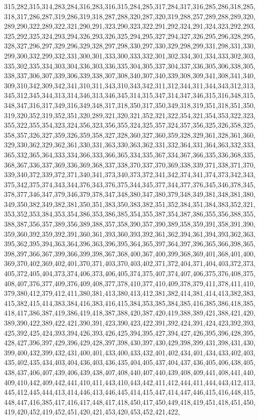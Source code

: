 315,282,315,314,283,284,316,283,316,315,284,285,317,284,317,316,285,286,318,285,318,317,286,287,319,286,319,318,287,288,320,287,320,319,288,257,289,288,289,320,289,290,322,289,322,321,290,291,323,290,323,322,291,292,324,291,324,323,292,293,325,292,325,324,293,294,326,293,326,325,294,295,327,294,327,326,295,296,328,295,328,327,296,297,329,296,329,328,297,298,330,297,330,329,298,299,331,298,331,330,299,300,332,299,332,331,300,301,333,300,333,332,301,302,334,301,334,333,302,303,335,302,335,334,303,304,336,303,336,335,304,305,337,304,337,336,305,306,338,305,338,337,306,307,339,306,339,338,307,308,340,307,340,339,308,309,341,308,341,340,309,310,342,309,342,341,310,311,343,310,343,342,311,312,344,311,344,343,312,313,345,312,345,344,313,314,346,313,346,345,314,315,347,314,347,346,315,316,348,315,348,347,316,317,349,316,349,348,317,318,350,317,350,349,318,319,351,318,351,350,319,320,352,319,352,351,320,289,321,320,321,352,321,322,354,321,354,353,322,323,355,322,355,354,323,324,356,323,356,355,324,325,357,324,357,356,325,326,358,325,358,357,326,327,359,326,359,358,327,328,360,327,360,359,328,329,361,328,361,360,329,330,362,329,362,361,330,331,363,330,363,362,331,332,364,331,364,363,332,333,365,332,365,364,333,334,366,333,366,365,334,335,367,334,367,366,335,336,368,335,368,367,336,337,369,336,369,368,337,338,370,337,370,369,338,339,371,338,371,370,339,340,372,339,372,371,340,341,373,340,373,372,341,342,374,341,374,373,342,343,375,342,375,374,343,344,376,343,376,375,344,345,377,344,377,376,345,346,378,345,378,377,346,347,379,346,379,378,347,348,380,347,380,379,348,349,381,348,381,380,349,350,382,349,382,381,350,351,383,350,383,382,351,352,384,351,384,383,352,321,353,352,353,384,353,354,386,353,386,385,354,355,387,354,387,386,355,356,388,355,388,387,356,357,389,356,389,388,357,358,390,357,390,389,358,359,391,358,391,390,359,360,392,359,392,391,360,361,393,360,393,392,361,362,394,361,394,393,362,363,395,362,395,394,363,364,396,363,396,395,364,365,397,364,397,396,365,366,398,365,398,397,366,367,399,366,399,398,367,368,400,367,400,399,368,369,401,368,401,400,369,370,402,369,402,401,370,371,403,370,403,402,371,372,404,371,404,403,372,373,405,372,405,404,373,374,406,373,406,405,374,375,407,374,407,406,375,376,408,375,408,407,376,377,409,376,409,408,377,378,410,377,410,409,378,379,411,378,411,410,379,380,412,379,412,411,380,381,413,380,413,412,381,382,414,381,414,413,382,383,415,382,415,414,383,384,416,383,416,415,384,353,385,384,385,416,385,386,418,385,418,417,386,387,419,386,419,418,387,388,420,387,420,419,388,389,421,388,421,420,389,390,422,389,422,421,390,391,423,390,423,422,391,392,424,391,424,423,392,393,425,392,425,424,393,394,426,393,426,425,394,395,427,394,427,426,395,396,428,395,428,427,396,397,429,396,429,428,397,398,430,397,430,429,398,399,431,398,431,430,399,400,432,399,432,431,400,401,433,400,433,432,401,402,434,401,434,433,402,403,435,402,435,434,403,404,436,403,436,435,404,405,437,404,437,436,405,406,438,405,438,437,406,407,439,406,439,438,407,408,440,407,440,439,408,409,441,408,441,440,409,410,442,409,442,441,410,411,443,410,443,442,411,412,444,411,444,443,412,413,445,412,445,444,413,414,446,413,446,445,414,415,447,414,447,446,415,416,448,415,448,447,416,385,417,416,417,448,417,418,450,417,450,449,418,419,451,418,451,450,419,420,452,419,452,451,420,421,453,420,453,452,421,422,
